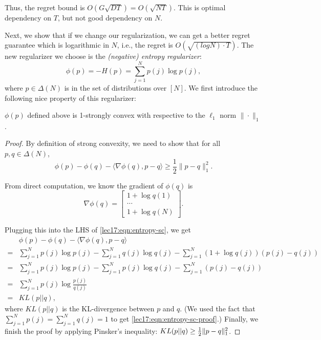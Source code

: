 Thus, the regret bound is $O(G\sqrt{DT}) = O(\sqrt{NT})$. This is optimal dependency on $T$, but not good dependency on $N$.

Next, we show that if we change our regularization, we can get a better regret guarantee which is logarithmic in $N$, i.e., the regret is $O(\sqrt{(log N) \cdot T})$. The new regularizer we choose is the \textit{(negative) entropy regularizer}:
\begin{equation}
\phi(p) = -H(p) = \sum_{j=1}^N p(j)\log p(j),
\end{equation}
where $p \in \Delta(N)$ is in the set of distributions over $[N]$. We first introduce the following nice property of this regularizer:
\begin{lemma}
	$\phi(p)$ defined above is 1-strongly convex with respective to the $\ell_1$ norm $\|\cdot\|_1$. 
\end{lemma}

\begin{proof}
By definition of strong convexity, we need to show that for all $p, q \in \Delta(N)$,
\begin{equation}\label{lec17:eqn:entropy-sc}
\phi(p) - \phi(q) - \langle \nabla \phi(q), p-q\rangle \geq \frac{1}{2} \|p-q\|_1^2.
\end{equation}
	
From direct computation, we know the gradient of $\phi(q)$ is 
\begin{equation}
\nabla\phi(q) = \begin{bmatrix} 1+\log q(1)\\\cdots \\ 1+\log q(N) \end{bmatrix}.
\end{equation}
	
Plugging this into the LHS of \eqref{lec17:eqn:entropy-sc}, we get
\begin{align}
&\phi(p) - \phi(q) - \langle \nabla \phi(q), p-q\rangle  \\
=& \sum_{j=1}^N p(j)\log p(j) - \sum_{j=1}^N q(j)\log q(j) - \sum_{j=1}^N \left(1 + \log q(j)\right)\left(p(j) - q(j)\right) \\
=& \sum_{j=1}^N p(j)\log p(j) - \sum_{j=1}^N p(j)\log q(j) - \sum_{j=1}^N \left(p(j) - q(j)\right)\\
=& \sum_{j=1}^N p(j) \log \frac{p(j)}{q(j)} \label{lec17:eqn:entropy-sc-proof} \\
=& KL(p||q),
\end{align}
where $KL(p || q)$ is the KL-divergence between $p$ and $q$. (We used the fact that $\sum_{j=1}^N p(j) = \sum_{j=1}^N q(j) = 1$ to get \eqref{lec17:eqn:entropy-sc-proof}.) Finally, we finish the proof by applying Pinsker's inequality: $KL(p||q) \geq \frac{1}{2} \|p-q\|_1^2$. 
	
\end{proof}


